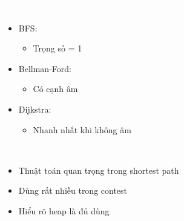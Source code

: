 \documentclass{beamer}
\newcommand{\hlgreen}[1]{\textcolor{mygreen}{#1}}
\newcommand{\hlwhite}[1]{\textcolor{white}{#1}}
\begin{document}

\begin{frame}{\hlwhite{So sánh}}
\begin{itemize}
\item BFS:
\begin{itemize}
\item Trọng số = 1
\end{itemize}

\item Bellman-Ford:
\begin{itemize}
\item Có cạnh âm
\end{itemize}

\item Dijkstra:
\begin{itemize}
\item \hlgreen{Nhanh nhất khi không âm}
\end{itemize}
\end{itemize}
\end{frame}


\begin{frame}{\hlwhite{Kết luận}}
\begin{itemize}
\item Thuật toán quan trọng trong shortest path
\item Dùng rất nhiều trong contest
\item Hiểu rõ heap là đủ dùng
\end{itemize}
\end{frame}
\end{document}
